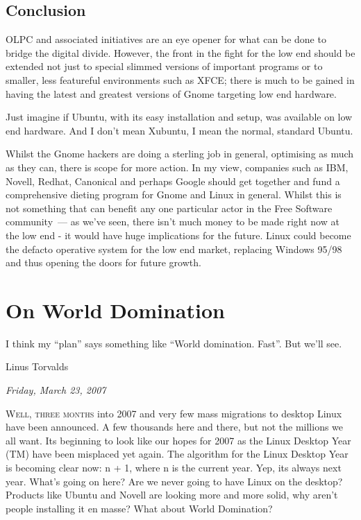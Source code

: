 \documentclass{book}
\begin{document}
\section{Conclusion}

OLPC and associated initiatives are an eye opener for what can be done
to bridge the digital divide. However, the front in the fight for the
low end should be extended not just to special slimmed versions of
important programs or to smaller, less featureful environments such as
XFCE; there is much to be gained in having the latest and greatest
versions of Gnome targeting low end hardware.

Just imagine if Ubuntu, with its easy installation and setup, was
available on low end hardware. And I don't mean Xubuntu, I mean the
normal, standard Ubuntu.

Whilst the Gnome hackers are doing a sterling job in general,
optimising as much as they can, there is scope for more action. In my
view, companies such as IBM, Novell, Redhat, Canonical and perhaps
Google should get together and fund a comprehensive dieting program
for Gnome and Linux in general. Whilst this is not something that can
benefit any one particular actor in the Free Software community~--- as
we've seen, there isn't much money to be made right now at the low end
- it would have huge implications for the future. Linux could become
the defacto operative system for the low end market, replacing Windows
95/98 and thus opening the doors for future growth.

\chapter{On World Domination}

\epigraph{I think my ``plan'' says something like ``World
  domination. Fast''. But we'll see.}{Linus Torvalds}

\begin{flushright}
  \emph{Friday, March 23, 2007 }
\end{flushright}

\lettrine{W}{ell, three months} into 2007 and very few mass migrations
to desktop Linux have been announced. A few thousands here and there,
but not the millions we all want. Its beginning to look like our hopes
for 2007 as the Linux Desktop Year (TM) have been misplaced yet
again. The algorithm for the Linux Desktop Year is becoming clear now:
n + 1, where n is the current year. Yep, its always next year. What's
going on here? Are we never going to have Linux on the desktop?
Products like Ubuntu and Novell are looking more and more solid, why
aren't people installing it en masse? What about World Domination?
\end{document}
